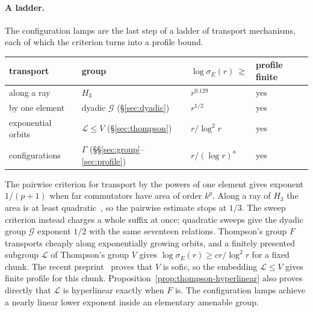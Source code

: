 

\paragraph{A ladder.} The configuration lamps are the last step of a ladder of transport mechanisms, each of which the criterion turns into a
profile bound.

\begin{center}
\begin{tabular}{llll}
\toprule
transport & group & $\log\sigma_E(r)\ \gtrsim$ & profile finite \\
\midrule
along a ray & $H_3$~\cite{DouglasMghirbiA} & $r^{0.129}$ & yes \\
by one element & dyadic $\mathcal G$ (\S\ref{sec:dyadic}) & $r^{1/2}$ & yes \\
exponential orbits & $\mathcal L\le V$ (\S\ref{sec:thompson}) & $r/\log^2r$ & yes~\cite{CJM2026} \\
configurations & $\Gamma$ (\S\S\ref{sec:group}--\ref{sec:profile}) & $r/(\log r)^{\kappa}$ & yes \\
\bottomrule
\end{tabular}
\end{center}

\noindent The pairwise criterion for transport by the powers of one element gives exponent $1/(p+1)$ when far commutators have area of order $k^p$. Along a ray of $H_3$
the area is at least quadratic~\cite[Proposition~3.4]{DouglasMghirbiA}, so the pairwise estimate stops at $1/3$.
The sweep criterion instead charges a whole suffix at once; quadratic sweeps give the dyadic group $\mathcal G$ exponent $1/2$ with the same seventeen relations. Thompson's group $F$ transports cheaply along exponentially growing orbits, and a finitely presented
subgroup $\mathcal L$ of Thompson's group $V$ gives
$\log\sigma_E(r)\ge c r/\log^2 r$ for a fixed chunk.
The recent preprint~\cite[Theorem~1.1]{CJM2026} proves that $V$ is sofic,
so the embedding $\mathcal L\le V$ gives finite profile for this chunk.
Proposition~\ref{prop:thompson-hyperlinear} also proves directly that
$\mathcal L$ is hyperlinear exactly when $F$ is.
The configuration lamps achieve a nearly linear lower exponent inside an
elementary amenable group.

